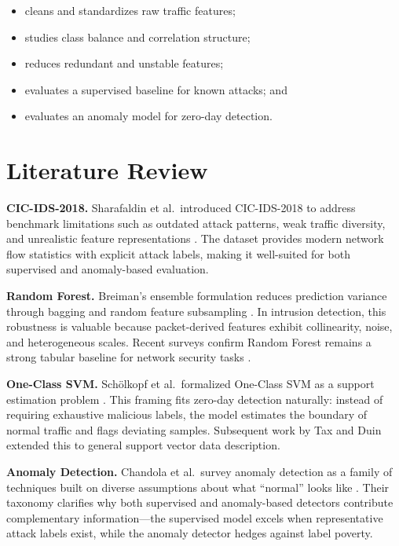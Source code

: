 \documentclass[10pt,conference]{IEEEtran}
\begin{document}
\begin{itemize}[leftmargin=*,noitemsep]
  \item cleans and standardizes raw traffic features;
  \item studies class balance and correlation structure;
  \item reduces redundant and unstable features;
  \item evaluates a supervised baseline for known attacks; and
  \item evaluates an anomaly model for zero-day detection.
\end{itemize}

\section{Literature Review}
\label{sec:lit}

\textbf{CIC-IDS-2018.} Sharafaldin et al.\ introduced CIC-IDS-2018 to
address benchmark limitations such as outdated attack patterns, weak
traffic diversity, and unrealistic feature representations
\cite{sharafaldin2018}. The dataset provides modern network flow
statistics with explicit attack labels, making it well-suited for both
supervised and anomaly-based evaluation.

\textbf{Random Forest.} Breiman's ensemble formulation reduces
prediction variance through bagging and random feature subsampling
\cite{breiman2001}. In intrusion detection, this robustness is
valuable because packet-derived features exhibit collinearity, noise,
and heterogeneous scales. Recent surveys confirm Random Forest remains
a strong tabular baseline for network security tasks \cite{buczak2016}.

\textbf{One-Class SVM.} Schölkopf et al.\ formalized One-Class SVM as
a support estimation problem \cite{scholkopf2001}. This framing fits
zero-day detection naturally: instead of requiring exhaustive malicious
labels, the model estimates the boundary of normal traffic and flags
deviating samples. Subsequent work by Tax and Duin extended this to
general support vector data description.

\textbf{Anomaly Detection.} Chandola et al.\ survey anomaly detection
as a family of techniques built on diverse assumptions about what
``normal'' looks like \cite{chandola2009}. Their taxonomy clarifies why
both supervised and anomaly-based detectors contribute complementary
information—the supervised model excels when representative attack
labels exist, while the anomaly detector hedges against label poverty.
\end{document}
